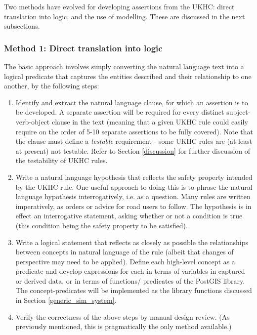 Two methods have evolved for developing assertions from the UKHC: direct translation into logic, and the use of modelling. These are discussed in the next subsections.

\subsubsection{Method 1: Direct translation into logic} \label{direct_translation}

The basic approach involves simply converting the natural language text into a logical predicate that captures the entities described and their relationship to one another, by the following steps: 
\begin{enumerate}
    \item Identify and extract the natural language clause, for which an assertion is to be developed. A separate assertion will be required for every distinct subject-verb-object clause in the text (meaning that a given UKHC rule could easily require on the order of 5-10 separate assertions to be fully covered). Note that the clause must define a \emph{testable} requirement - some UKHC rules are (at least at present) not testable. Refer to Section \ref{discussion} for further discussion of the testability of UKHC rules.
    \item Write a natural language hypothesis that reflects the safety property intended by the UKHC rule. One useful approach to doing this is to phrase the natural language hypothesis interrogatively, i.e. as a question. Many rules are written imperatively, as orders or advice for road users to follow. The hypothesis is in effect an interrogative statement, asking whether or not a condition is true (this condition being the safety property to be satisfied). 
    \item Write a logical statement that reflects as closely as possible the relationships between concepts in natural language of the rule (albeit that changes of perspective may need to be applied). Define each high-level concept as a predicate and develop expressions for each in terms of variables in captured or derived data, or in terms of functions/ predicates of the PostGIS library. The concept-predicates will be implemented as the library functions discussed in Section \ref{generic_sim_system}.%
    \item Verify the correctness of the above steps by manual design review. (As previously mentioned, this is pragmatically the only method available.)
\end{enumerate}

